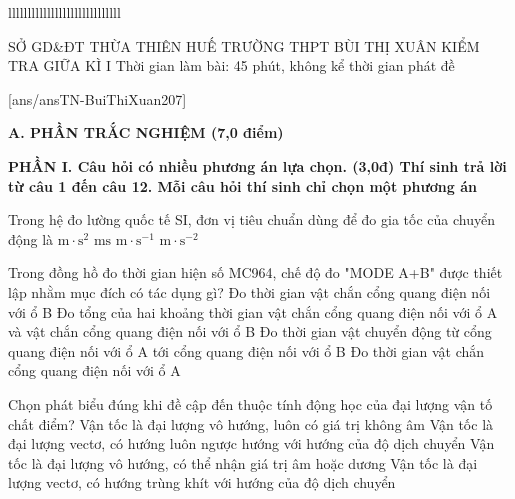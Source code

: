lllllllllllllllllllllllllllll%
\def\toanlop{10}
\def\thoigian{45}
\def\namhoc{2024 - 2025}
\begin{dethi}
	{SỞ GD\&ĐT THỪA THIÊN HUẾ}
	{TRƯỜNG THPT BÙI THỊ XUÂN}
	{KIỂM TRA GIỮA KÌ I}
	{Thời gian làm bài: 45 phút, không kể thời gian phát đề}
\end{dethi}
	
	[ans/ansTN-BuiThiXuan207]
	
	\noindent \textbf{A. PHẦN TRẮC NGHIỆM (7,0 điểm)}
	
	\noindent \textbf{PHẦN I. Câu hỏi có nhiều phương án lựa chọn. (3,0đ) Thí sinh trả lời từ câu 1 đến câu 12. Mỗi câu hỏi thí sinh chỉ chọn một phương án}
	\vspace{0.2cm}
	
	\begin{ex}%
		Trong hệ đo lường quốc tế SI, đơn vị tiêu chuẩn dùng để đo gia tốc của chuyển động là
		\choice
		{$\text{m}\cdot\text{s}^2$}
		{$\text{ms}$}
		{$\text{m}\cdot\text{s}^{-1}$}
		{\True $\text{m}\cdot\text{s}^{-2}$}
	\end{ex}
	
	\begin{ex}%
		Trong đồng hồ đo thời gian hiện số MC964, chế độ đo "MODE A+B" được thiết lập nhằm mục đích có tác dụng gì?
		\choice
		{Đo thời gian vật chắn cổng quang điện nối với ổ B}
		{\True Đo tổng của hai khoảng thời gian vật chắn cổng quang điện nối với ổ A và vật chắn cổng quang điện nối với ổ B}
		{Đo thời gian vật chuyển động từ cổng quang điện nối với ổ A tới cổng quang điện nối với ổ B}
		{Đo thời gian vật chắn cổng quang điện nối với ổ A}
	\end{ex}
	
	\begin{ex}%
		Chọn phát biểu đúng khi đề cập đến thuộc tính động học của đại lượng vận tố chất điểm?
		\choice
		{Vận tốc là đại lượng vô hướng, luôn có giá trị không âm}
		{Vận tốc là đại lượng vectơ, có hướng luôn ngược hướng với hướng của độ dịch chuyển}
		{Vận tốc là đại lượng vô hướng, có thể nhận giá trị âm hoặc dương}
		{\True Vận tốc là đại lượng vectơ, có hướng trùng khít với hướng của độ dịch chuyển}
	\end{ex}
	
